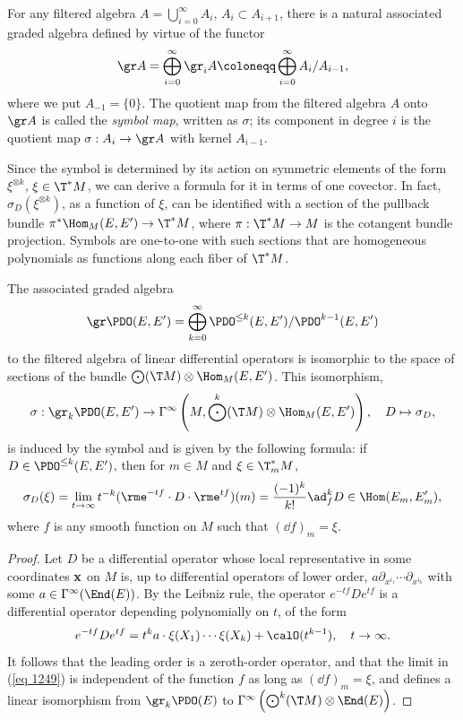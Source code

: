 \begin{defn}
    For any filtered algebra $A=\bigcup_{i=0}^\infty A_i$, $A_i\subset A_{i+1}$, there is a natural associated graded algebra defined by virtue of the functor 
    \[\gr A= \bigoplus_{i=0}^\infty \gr_i A\coloneqq \bigoplus_{i=0}^\infty A_i\slash A_{i-1},\]
    where we put $A_{-1}=\{0\}$. The quotient map from the filtered algebra $A$ onto $\gr A$ is called the \emph{symbol map}, written as $\sigma$; its component in degree $i$ is the quotient map $\sigma:A_i\to \gr A$ with kernel $A_{i-1}$.
\end{defn}

Since the symbol is determined by its action on symmetric elements of the form $\xi^{\otimes k}$, $\xi\in \T^\ast M$, we can derive a formula for it in terms of one covector. In fact, $\sigma_D(\xi^{\otimes k})$, as a function of $\xi$, can be identified with a section of the pullback bundle $\pi^\ast \Hom_M(E,E')\to \T^\ast M$, where $\pi:\T^\ast M\to M$ is the cotangent bundle projection. Symbols are one-to-one with such sections that are homogeneous polynomials as functions along each fiber of $\T^\ast M$.

\begin{prop}
    The associated graded algebra 
    \[\gr\PDO(E,E')=\bigoplus_{k=0}^{\infty}\PDO^{\leq k}(E,E')\slash\PDO^{k-1}(E,E')\]
    to the filtered algebra of linear differential operators is isomorphic to the space of sections of the bundle $\bigodot(\T M)\otimes\Hom_M(E,E')$. This isomorphism,
    \[\sigma:\gr_k\PDO(E,E')\to \Gamma^\infty\left(M,\bigodot^k(\T M)\otimes\Hom_M(E,E')\right),\quad D\mapsto \sigma_D,\] 
    is induced by the symbol and is given by the following formula: if $D\in\PDO^{\leq k}(E,E')$, then for $m\in M$ and $\xi\in \T^\ast_m M$,
    \[\sigma_D(\xi)=\lim_{t\to\infty}t^{-k}(\rme^{-tf}\cdot D\cdot \rme^{tf})(m)=\frac{(-1)^k}{k!}\ad_f^k D\in\Hom(E_m,E_m'),\label{eq 1249}\]
    where $f$ is any smooth function on $M$ such that $(\dd f)_m=\xi$.
\end{prop}
\begin{proof}
    Let $D$ be a differential operator whose local representative in some coordinates $\bf{x}$ on $M$ is, up to differential operators of lower order, $a \partial_{x^{i_1}}\cdots\partial_{x^{i_k}}$ with some $a\in\Gamma^\infty(\End(E))$. By the Leibniz rule, the operator $e^{-tf}De^{tf}$ is a differential operator depending polynomially on $t$, of the form 
    \[e^{-tf}De^{tf}=t^k a\cdot \xi(X_1)\cdots \xi(X_k)+\calO(t^{k-1}),\quad t\to\infty.\]
    It follows that the leading order is a zeroth-order operator, and that the limit in (\ref{eq 1249}) is independent of the function $f$ as long as $(\dd f)_m=\xi$, and defines a linear isomorphism from $\gr_k\PDO(E)$ to $\Gamma^\infty\left(\bigodot^k(\T M)\otimes \End(E)\right)$.
\end{proof}


